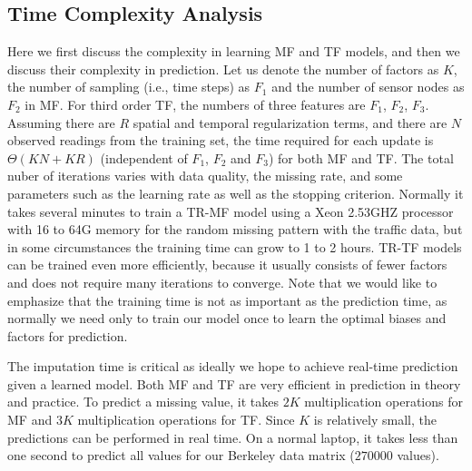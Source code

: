 \subsection{Time Complexity Analysis}
Here we first discuss the complexity in learning MF and TF models, and then we discuss their complexity in prediction.
Let us denote the number of factors as $K$, the number of sampling (i.e., time steps) as $F_1$ and the number of sensor nodes as $F_2$ in MF.
For third order TF, the numbers of three features are $F_1$, $F_2$, $F_3$.  
Assuming there are $R$ spatial and temporal regularization terms, and there are $N$ observed readings from the training set, the time required for each update is $\Theta(KN + KR)$ (independent of $F_1$, $F_2$ and $F_3$) for both MF and TF.
The total nuber of iterations varies with data quality, the missing rate, and some parameters such as the learning rate as well as the stopping criterion.
Normally it takes several minutes to train a TR-MF model using a Xeon 2.53GHZ processor with 16 to 64G memory for the random missing pattern with the traffic data, but in some circumstances the training time can grow to 1 to 2 hours.
TR-TF models can be trained even more efficiently, because it usually consists of fewer factors and does not require many iterations to converge. 
Note that we would like to emphasize that the training time is not as important as the prediction time, as normally we need only to train our model once to learn the optimal biases and factors for prediction.

The imputation time is critical as ideally we hope to achieve real-time prediction given a learned model. 
Both MF and TF are very efficient in prediction in theory and practice.
To predict a missing value, it takes $2K$ multiplication operations for MF and $3K$ multiplication operations for TF.
Since $K$ is relatively small, the predictions can be performed in real time.
On a normal laptop, it takes less than one second to predict all values for our Berkeley data matrix ($270000$ values).

